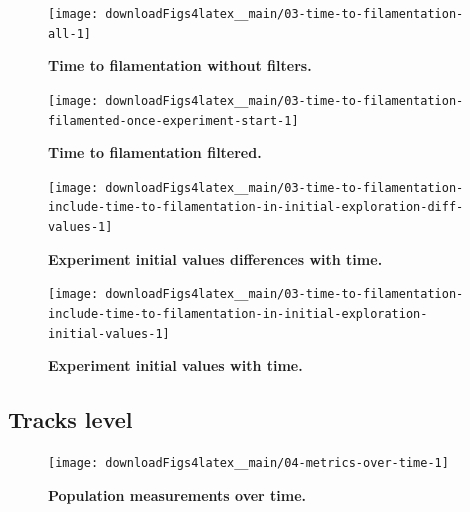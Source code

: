 \documentclass[a4paper, nobind]{templates/ociamthesis}
\begin{document}
\begin{figure}[H]
\texttt{[image: downloadFigs4latex\_\_main/03-time-to-filamentation-all-1]} \caption[Time to filamentation without filters.]{\textbf{Time to filamentation without filters.}}\label{fig:03-time-to-filamentation-all-1}
\end{figure}





\begin{figure}[H]
\texttt{[image: downloadFigs4latex\_\_main/03-time-to-filamentation-filamented-once-experiment-start-1]} \caption[Time to filamentation filtered.]{\textbf{Time to filamentation filtered.}}\label{fig:03-time-to-filamentation-filamented-once-experiment-start-1}
\end{figure}





\begin{figure}[H]
\texttt{[image: downloadFigs4latex\_\_main/03-time-to-filamentation-include-time-to-filamentation-in-initial-exploration-diff-values-1]} \caption[Experiment initial values differences with time.]{\textbf{Experiment initial values differences with time.}}\label{fig:03-time-to-filamentation-include-time-to-filamentation-in-initial-exploration-diff-values-1}
\end{figure}





\begin{figure}[H]
\texttt{[image: downloadFigs4latex\_\_main/03-time-to-filamentation-include-time-to-filamentation-in-initial-exploration-initial-values-1]} \caption[Experiment initial values with time.]{\textbf{Experiment initial values with time.}}\label{fig:03-time-to-filamentation-include-time-to-filamentation-in-initial-exploration-initial-values-1}
\end{figure}

\hypertarget{tracks-level}{%
\subsection{Tracks level}\label{tracks-level}}





\begin{figure}[H]
\texttt{[image: downloadFigs4latex\_\_main/04-metrics-over-time-1]} \caption[Population measurements over time.]{\textbf{Population measurements over time.}}\label{fig:04-metrics-over-time-1}
\end{figure}
\end{document}
